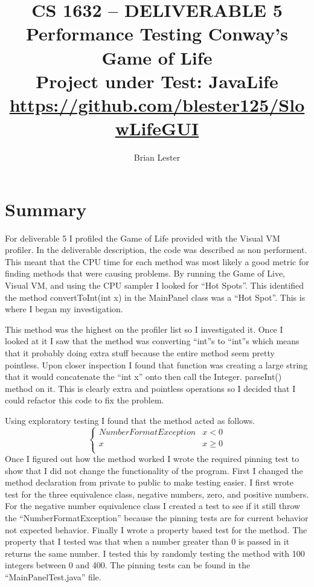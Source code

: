 \documentclass[titlepage]{article}
\title{CS 1632 -- DELIVERABLE 5\\
Performance Testing Conway's Game of Life\\
Project under Test: JavaLife\\
\small{\url{https://github.com/blester125/SlowLifeGUI}}}
\author{Brian Lester}
\begin{document}
\maketitle
\section{Summary}
For deliverable 5 I profiled the Game of Life provided with the Visual VM 
profiler. In the deliverable description, the code was described as non 
performent. This meant that the CPU time for each method was most likely a good 
metric for finding methods that were causing problems. By running the Game of 
Live, Visual VM, and using the CPU sampler I looked for ``Hot Spots''. This 
identified the method convertToInt(int x) in the MainPanel class was a 
``Hot Spot''. This is where I began my investigation.

This method was the highest on the profiler list so I investigated it. Once I 
looked at it I saw that the method was converting ``int''s to ``int''s which 
means that it probably doing extra stuff because the entire method seem pretty 
pointless. Upon closer inspection I found that function was creating a large 
string that it would concatenate the ``int x'' onto then call the Integer.
parseInt() method on it. This is clearly extra and pointless operations so I 
decided that I could refactor this code to fix the problem.

Using exploratory testing I found that the method acted as follows. 
\[
	\begin{cases}
		NumberFormatException & x < 0\\
		x & x \geq 0\\
	\end{cases}
\]
Once I figured out how the method worked I wrote the required pinning test to 
show that I did not change the functionality of the program. First I changed the 
method declaration from private to public to make testing easier. I first wrote 
test 
for the three equivalence class, negative numbers, zero, and positive numbers. 
For the negative number equivalence class I created a test to see if it still 
throw the ``NumberFormatException'' because the pinning tests are for current 
behavior not expected behavior. Finally I wrote a property based test for the 
method. The property that I tested was that when a number greater than 0 is 
passed in it returns the same number. I tested this by randomly testing the 
method with 100 integers between 0 and 400. The pinning tests can be found in the 
``MainPanelTest.java'' file.
\end{document}
